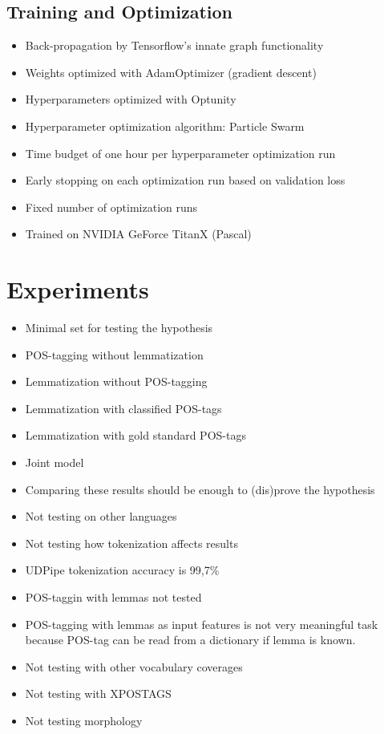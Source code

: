 \documentclass[12pt,a4paper,english
]{tutthesis}
\begin{document}
\subsection{Training and Optimization}
\begin{itemize}
\item Back-propagation by Tensorflow's innate graph functionality
\item Weights optimized with AdamOptimizer (gradient descent)
\item Hyperparameters optimized with Optunity
\item Hyperparameter optimization algorithm: Particle Swarm
\item Time budget of one hour per hyperparameter optimization run
\item Early stopping on each optimization run based on validation loss
\item Fixed number of optimization runs
\item Trained on NVIDIA GeForce TitanX (Pascal)
\end{itemize}

\section{Experiments}
\label{se:experiments}
\begin{itemize}
\item Minimal set for testing the hypothesis
\item POS-tagging without lemmatization
\item Lemmatization without POS-tagging
\item Lemmatization with classified POS-tags
\item Lemmatization with gold standard POS-tags
\item Joint model
\item Comparing these results should be enough to (dis)prove the hypothesis
\item Not testing on other languages
\item Not testing how tokenization affects results
\item UDPipe tokenization accuracy is 99,7\% \cite{Straka2017}
\item POS-taggin with lemmas not tested
\item POS-tagging with lemmas as input features is not very meaningful task because POS-tag can be read from a dictionary if lemma is known.
\item Not testing with other vocabulary coverages
\item Not testing with XPOSTAGS
\item Not testing morphology
\end{itemize}
\end{document}
